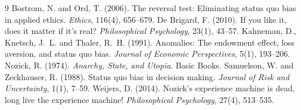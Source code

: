 \documentclass{situationist-preprint}
\begin{document}
\begin{thebibliography}{9}\small
{} Bostrom, N. and Ord, T. (2006). The reversal test: Eliminating status quo bias in applied ethics. \emph{Ethics}, 116(4), 656--679.
 De Brigard, F. (2010). If you like it, does it matter if it's real? \emph{Philosophical Psychology}, 23(1), 43--57.
 Kahneman, D., Knetsch, J.~L. and Thaler, R.~H. (1991). Anomalies: The endowment effect, loss aversion, and status quo bias. \emph{Journal of Economic Perspectives}, 5(1), 193--206.
 Nozick, R. (1974). \emph{Anarchy, State, and Utopia}. Basic Books.
 Samuelson, W. and Zeckhauser, R. (1988). Status quo bias in decision making. \emph{Journal of Risk and Uncertainty}, 1(1), 7--59.
 Weijers, D. (2014). Nozick's experience machine is dead, long live the experience machine! \emph{Philosophical Psychology}, 27(4), 513--535.
\end{thebibliography}
\end{document}
